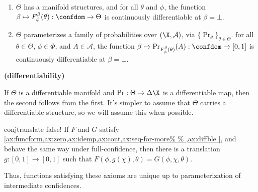 \begin{CFaxioms}
	\item \label{ax:diffble}
	\begin{enumerate}
	\item $\Theta$ has a manifold structures, and
		for all $\theta$ and $\phi$, the function $\beta \mapsto F^{\beta}_\phi(\theta) : \confdom \to \Theta$
		is continuously differentiable at $\beta = \bot$. %
	\item 
		$\Theta$ parameterizes a family of probabilities over $(\X, \mathcal A)$,
		via $\{ \Pr_\theta \}_{\theta \in \Theta}$.
		for all $\theta \in \Theta$, $\phi \in \Phi$, and  $A \in \mathcal A$,
		the function $\beta \mapsto \Pr_{F^{\beta}_\phi(\theta)}(A)
		: \confdom \to \mathbb [0,1]$ is
		continuously differentiable at $\beta=\bot$. 
			\label{ax:diffble2}
	\end{enumerate}
	\hfill \textbf{(differentiability)}
\end{CFaxioms}

If $\Theta$ is a differentiable manifold and $\Pr: \Theta \to \Delta\X$ is a differentiable map, then the second follows from the first. 
It's simpler to assume that $\Theta$ carries a differentiable structure, so we will assume this when possible.










%
\begin{linked}{conj}{translate}
	{\color{red} false!}
	If 
	$F$ and $G$ satisfy
	\cref{ax:funcform,ax:zero,ax:idemp,ax:cont,ax:seq-for-more%
		},
	and behave the same way under full-confidence,
	then 
	there is a translation 
	$g: [0,1] \to [0,1]$ 
	such that
	$F(\phi, g(\chi), \theta) = G(\phi, \chi, \theta)$. 
\end{linked}
Thus, functions satisfying these axioms are unique up to parameterization
of intermediate confidences.




